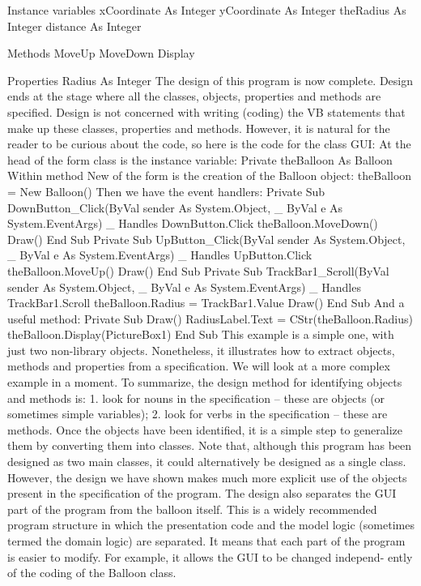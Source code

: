 Instance variables
xCoordinate As Integer
yCoordinate As Integer
theRadius As Integer
distance As Integer


Methods
MoveUp
MoveDown
Display


Properties
Radius As Integer
The design of this program is now complete. Design ends at the stage where all the classes, objects, properties and methods are speciﬁed. Design is not concerned with writing (coding) the VB statements that make up these classes, properties and methods. However, it is natural for the reader to be curious about the code, so here is the code for the class GUI:
At the head of the form class is the instance variable:
Private theBalloon As Balloon
Within method New of the form is the creation of the Balloon object:
theBalloon = New Balloon()
Then we have the event handlers:
Private Sub DownButton_Click(ByVal sender As System.Object, _
			ByVal e As System.EventArgs) _
			Handles DownButton.Click
	theBalloon.MoveDown()
	Draw()
End Sub
Private Sub UpButton_Click(ByVal sender As System.Object, _
		ByVal e As System.EventArgs) _
		Handles UpButton.Click
	theBalloon.MoveUp()
	Draw()
End Sub
Private Sub TrackBar1_Scroll(ByVal sender As System.Object, _
		ByVal e As System.EventArgs) _
		Handles TrackBar1.Scroll
	theBalloon.Radius = TrackBar1.Value
	Draw()
End Sub
And a useful method:
Private Sub Draw()
	RadiusLabel.Text = CStr(theBalloon.Radius)
	theBalloon.Display(PictureBox1)
End Sub
This example is a simple one, with just two non-library objects. Nonetheless, it illustrates how to extract objects, methods and properties from a speciﬁcation. We will look at a more complex example in a moment.
To summarize, the design method for identifying objects and methods is:
1.	look for nouns in the speciﬁcation – these are objects (or sometimes simple variables);
2.	look for verbs in the speciﬁcation – these are methods.
Once the objects have been identiﬁed, it is a simple step to generalize them by converting them into classes.
Note that, although this program has been designed as two main classes, it could alternatively be designed as a single class. However, the design we have shown makes much more explicit use of the objects present in the speciﬁcation of the program. The design also separates the GUI part of the program from the balloon itself. This is a widely recommended program structure in which the presentation code and the model logic (sometimes termed the domain logic) are separated. It means that each part of the program is easier to modify. For example, it allows the GUI to be changed independ-
ently of the coding of the Balloon class.

